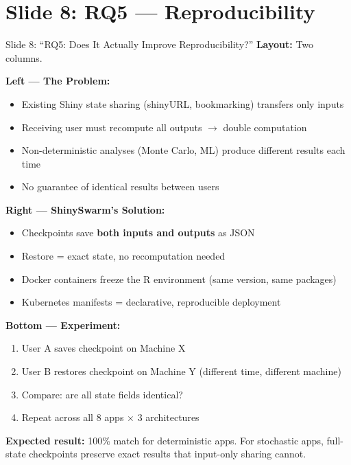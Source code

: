 \documentclass[12pt,a4paper]{article}
\begin{document}
\section{Slide 8: RQ5 --- Reproducibility}

\begin{slidebox}{Slide 8: ``RQ5: Does It Actually Improve Reproducibility?''}
\textbf{Layout:} Two columns.

\textbf{Left --- The Problem:}
\begin{itemize}[nosep]
  \item Existing Shiny state sharing (shinyURL, bookmarking) transfers only inputs
  \item Receiving user must recompute all outputs $\rightarrow$ double computation
  \item Non-deterministic analyses (Monte Carlo, ML) produce different results each time
  \item No guarantee of identical results between users
\end{itemize}

\textbf{Right --- ShinySwarm's Solution:}
\begin{itemize}[nosep]
  \item Checkpoints save \textbf{both inputs and outputs} as JSON
  \item Restore = exact state, no recomputation needed
  \item Docker containers freeze the R environment (same version, same packages)
  \item Kubernetes manifests = declarative, reproducible deployment
\end{itemize}

\textbf{Bottom --- Experiment:}
\begin{enumerate}[nosep]
  \item User A saves checkpoint on Machine X
  \item User B restores checkpoint on Machine Y (different time, different machine)
  \item Compare: are all state fields identical?
  \item Repeat across all 8 apps $\times$ 3 architectures
\end{enumerate}

\textbf{Expected result:} 100\% match for deterministic apps. For stochastic apps, full-state checkpoints preserve exact results that input-only sharing cannot.
\end{slidebox}
\end{document}
